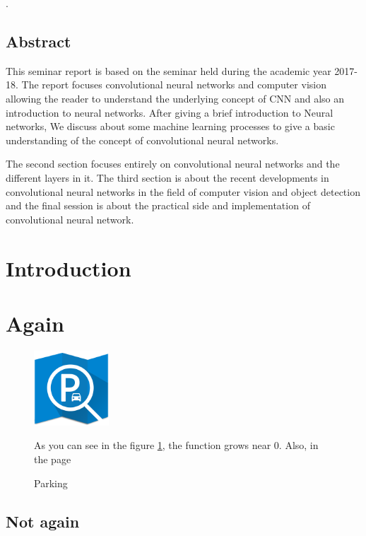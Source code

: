 \documentclass[12pt]{article}
\begin{document}
\newpage
.
\vspace{50mm}
\begin{center}
\section*{\fontsize{16}{18}\selectfont Abstract}
\end{center}
\par This seminar report is based on the seminar held during the academic year 2017-18. The report focuses convolutional neural networks and computer vision allowing the reader to understand the underlying concept of CNN and also an introduction to neural networks. After giving a brief introduction to Neural networks, We discuss about some machine learning processes to give a basic understanding of the concept of convolutional neural networks. 
\vspace{5mm}
\par The second section focuses entirely on convolutional neural networks and the different layers in it. The third section is about the recent developments in convolutional neural networks in the field of computer vision and object detection and the final session is about the practical side and implementation of convolutional neural network.

\newpage
{}
\tableofcontents
\newpage
{}

\listoffigures
\newpage


\vspace{25mm}
\section{\fontsize{14}{14}\selectfont Introduction}
 
\section{\fontsize{14}{14}\selectfont Again}
\begin{figure}[h]
    \centering
    \includegraphics[width=0.25\textwidth]{a.png}
    \caption{Parking}
    \label{fig:mesh1}
    As you can see in the figure \ref{fig:mesh1}, the 
function grows near 0. Also, in the page \pageref{fig:mesh1} 
\end{figure}
\Blindtext
\subsection{ Not again}
\Blindtext
\end{document}
